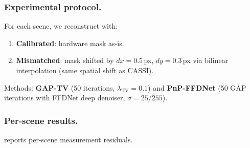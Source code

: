 \documentclass[runningheads]{llncs}
\begin{document}
\subsubsection{Experimental protocol.}
For each scene, we reconstruct with:
\begin{enumerate}
    \item \textbf{Calibrated}: hardware mask as-is.
    \item \textbf{Mismatched}: mask shifted by $dx{=}0.5$\,px, $dy{=}0.3$\,px via bilinear interpolation (same spatial shift as CASSI).
\end{enumerate}
Methods: \textbf{GAP-TV} (50 iterations, $\lambda_{\text{TV}}{=}0.1$) and \textbf{PnP-FFDNet} (50 GAP iterations with FFDNet deep denoiser, $\sigma{=}25/255$).

\subsubsection{Per-scene results.}
 reports per-scene measurement residuals.

\begin{table}[h]
\centering
\caption{CACTI real data: normalised measurement residual $r = \|\mathbf{y} - \mathbf{\Phi}\hat{\mathbf{x}}\|^2 / \|\mathbf{y}\|^2$ (lower is better). Ratio = mismatched / calibrated residual. 4 scenes, $512 \times 512$, $\text{cr}{=}10$.}
\label{tab:cacti_real_perscene}
\end{table}
\end{document}
